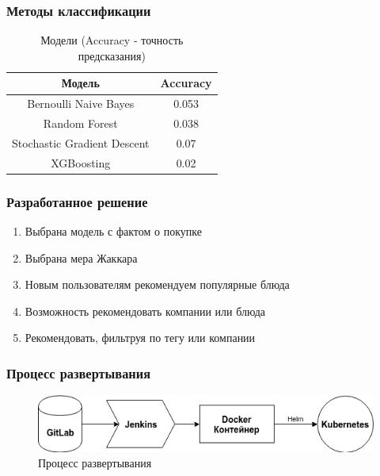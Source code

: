 \documentclass[10pt, unicode]{beamer}
\begin{document}
\begin{frame}
  \frametitle{Методы классификации}
  \begin{table}[H]
    \centering
    \begin{tabular} { | c | c | }
      \hline
      Модель & Accuracy \\
      \hline
      Bernoulli Naive Bayes & 0.053 \\
      Random Forest & 0.038 \\
      Stochastic Gradient Descent & 0.07 \\
      XGBoosting & 0.02 \\
      \hline
    \end{tabular}
    \caption{Модели (Accuracy - точность предсказания)}
  \end{table}
\end{frame}

\begin{frame}
  \frametitle{Разработанное решение}
  \begin{enumerate}
    \item Выбрана модель с фактом о покупке
    \item Выбрана мера Жаккара
    \item Новым пользователям рекомендуем популярные блюда
    \item Возможность рекомендовать компании или блюда
    \item Рекомендовать, фильтруя по тегу или компании
  \end{enumerate}
\end{frame}

\begin{frame}
  \frametitle{Процесс развертывания}
  \begin{figure}[H]
    \centering
    \includegraphics[scale=0.5]{images/deploy.png}
    \caption{Процесс развертывания}
  \end{figure}
\end{frame}
\end{document}
